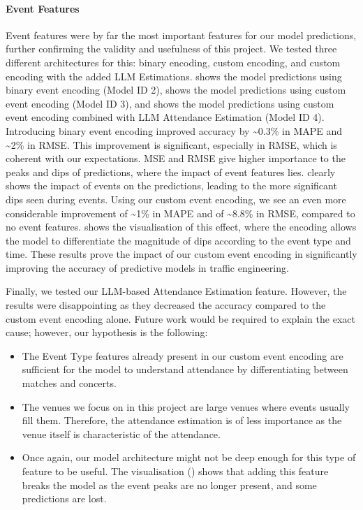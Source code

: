\paragraph{Event Features}
Event features were by far the most important features for our model predictions, further confirming the validity and usefulness of this project. We tested three different architectures for this: binary encoding, custom encoding, and custom encoding with the added LLM Estimations.  shows the model predictions using binary event encoding (Model ID 2),  shows the model predictions using custom event encoding (Model ID 3), and  shows the model predictions using custom event encoding combined with LLM Attendance Estimation (Model ID 4). Introducing binary event encoding improved accuracy by \~{}0.3\% in MAPE and \~{}2\% in RMSE. This improvement is significant, especially in RMSE, which is coherent with our expectations. MSE and RMSE give higher importance to the peaks and dips of predictions, where the impact of event features lies.  clearly shows the impact of events on the predictions, leading to the more significant dips seen during events. Using our custom event encoding, we see an even more considerable improvement of \~{}1\% in MAPE and of \~{}8.8\% in RMSE, compared to no event features.  shows the visualisation of this effect, where the encoding allows the model to differentiate the magnitude of dips according to the event type and time. These results prove the impact of our custom event encoding in significantly improving the accuracy of predictive models in traffic engineering.

Finally, we tested our LLM-based Attendance Estimation feature. However, the results were disappointing as they decreased the accuracy compared to the custom event encoding alone. Future work would be required to explain the exact cause; however, our hypothesis is the following:
\begin{itemize}
    \item The Event Type features already present in our custom event encoding are sufficient for the model to understand attendance by differentiating between matches and concerts.
    \item The venues we focus on in this project are large venues where events usually fill them. Therefore, the attendance estimation is of less importance as the venue itself is characteristic of the attendance.
    \item Once again, our model architecture might not be deep enough for this type of feature to be useful. The visualisation () shows that adding this feature breaks the model as the event peaks are no longer present, and some predictions are lost.
\end{itemize}

